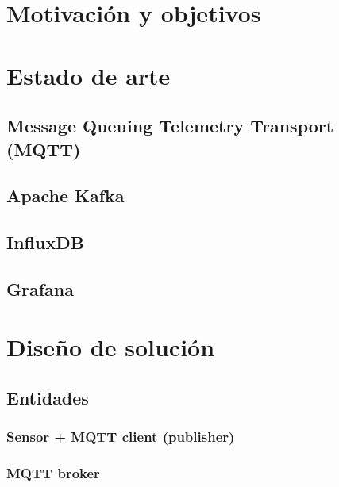 \documentclass[12pt, a4paper]{article}
\begin{document}
        \paragraph{}
        


        \section{Motivación y objetivos}



        \section{Estado de arte}

        \subsection{Message Queuing Telemetry Transport (MQTT)}
        
        \subsection{Apache Kafka}
        
        \subsection{InfluxDB}
        
        \subsection{Grafana}
        


        \section{Diseño de solución}

        \subsection{Entidades}

        \subsubsection{Sensor + MQTT client (publisher)}
        \subsubsection{MQTT broker}
\end{document}
